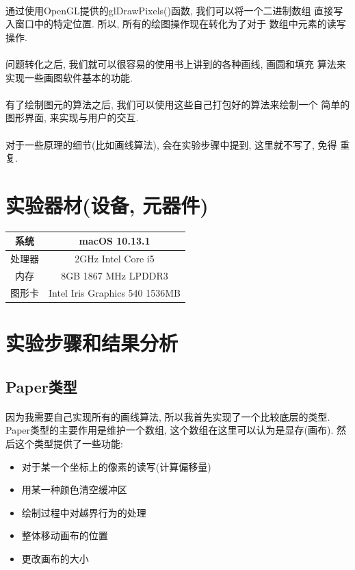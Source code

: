 \documentclass{article}
\begin{document}
	\paragraph{}
		通过使用OpenGL提供的glDrawPixels()函数, 我们可以将一个二进制数组
		直接写入窗口中的特定位置. 所以, 所有的绘图操作现在转化为了对于
		数组中元素的读写操作.
	\paragraph{}
		问题转化之后, 我们就可以很容易的使用书上讲到的各种画线, 画圆和填充
		算法来实现一些画图软件基本的功能.
	\paragraph{}
		有了绘制图元的算法之后, 我们可以使用这些自己打包好的算法来绘制一个
		简单的图形界面, 来实现与用户的交互.
	\paragraph{}
		对于一些原理的细节(比如画线算法), 会在实验步骤中提到, 这里就不写了, 免得
		重复.

\section{实验器材(设备, 元器件)}
	\begin{center}
		\begin{tabular}{|c|c|}
			\hline
			系统 & macOS 10.13.1 \\
			\hline
			处理器 & 2GHz Intel Core i5 \\
			\hline 
			内存 & 8GB 1867 MHz LPDDR3 \\
			\hline 
			图形卡 & Intel Iris Graphics 540 1536MB \\
			\hline
		\end{tabular}
	\end{center}
\section{实验步骤和结果分析}
	\subsection{Paper类型}
		\paragraph{}
			因为我需要自己实现所有的画线算法, 所以我首先实现了一个比较底层的类型.
			Paper类型的主要作用是维护一个数组, 这个数组在这里可以认为是显存(画布).
			然后这个类型提供了一些功能:
			\begin{itemize}
				\item 对于某一个坐标上的像素的读写(计算偏移量)
				\item 用某一种颜色清空缓冲区
				\item 绘制过程中对越界行为的处理
				\item 整体移动画布的位置
				\item 更改画布的大小
			\end{itemize}
\end{document}
